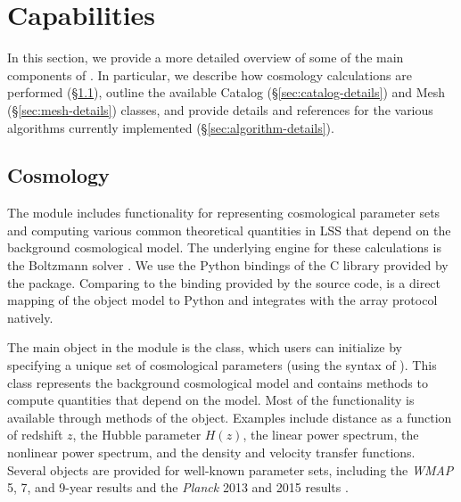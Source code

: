 \section{Capabilities}
\label{sec:capabilities}

In this section, we provide a more detailed overview of some of the main
components of \nbkit{}. In particular, we describe how cosmology
calculations are performed (\S\ref{sec:cosmo-details}), outline the available
Catalog (\S\ref{sec:catalog-details}) and Mesh (\S\ref{sec:mesh-details})
classes, and provide details and references for the various
algorithms currently implemented (\S\ref{sec:algorithm-details}).

\subsection{Cosmology}
\label{sec:cosmo-details}


The  module includes functionality for
representing cosmological parameter sets and computing
various common theoretical quantities in LSS that depend on the background
cosmological model. The underlying engine for these calculations is
the  Boltzmann solver \citep{Blas:2011,Lesgourgues:2011}.
We use the Python bindings of the  C library provided
by the \classylss{} package. Comparing to the binding provided by
the  source code, \classylss{} is a direct mapping of the
 object model to Python and integrates with the
\numpy{} array protocol natively.

The main object in the module is the  class,
which users can initialize by specifying a unique set of cosmological
parameters (using the syntax of ). This class represents
the background cosmological model and contains methods to compute
quantities that depend on the model. Most of the  functionality
is available through methods of the  object.
Examples include distance as a function of redshift $z$, the Hubble parameter
$H(z)$, the linear power spectrum, the nonlinear power spectrum,
and the density and velocity transfer functions.
Several  objects are provided for
well-known parameter sets, including the \textit{WMAP} 5, 7, and 9-year
results \citep{Komatsu:2009,Komatsu:2011,Hinshaw:2013} and the
\textit{Planck} 2013 and 2015 results \citep{Planck:2014,Planck:2016}.

